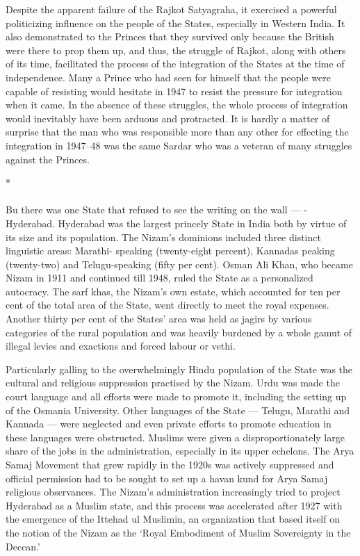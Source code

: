 \begin{multicols}{2}
Despite the apparent failure of the Rajkot Satyagraha, it exercised a powerful politicizing influence on the people of the States, especially in Western India. It also demonstrated to the Princes that they survived only because the British were there to prop them up, and thus, the struggle of Rajkot, along with others of its time, facilitated the process of the integration of the States at the time of independence. Many a Prince who had seen for himself that the people were capable of resisting would hesitate in 1947 to resist the pressure for integration when it came. In the absence of these struggles, the whole process of integration would inevitably have been arduous and protracted. It is hardly a matter of surprise that the man who was responsible more than any other for effecting the integration in 1947--48 was the same Sardar who was a veteran of many struggles against the Princes.

\begin{center}*\end{center}

\paragraph*{}
Bu there was one State that refused to see the writing on the wall --- - Hyderabad. Hyderabad was the largest princely State in India both by virtue of its size and its population. The Nizam's dominions included three distinct linguistic areas: Marathi- speaking (twenty-eight percent), Kannadas peaking (twenty-two) and Telugu-speaking (fifty per cent). Osman Ali Khan, who became Nizam in 1911 and continued till 1948, ruled the State as a personalized autocracy. The sarf khas, the Nizam's own estate, which accounted for ten per cent of the total area of the State, went directly to meet the royal expenses. Another thirty per cent of the States' area was held as jagirs by various categories of the rural population and was heavily burdened by a whole gamut of illegal levies and exactions and forced labour or vethi. 

Particularly galling to the overwhelmingly Hindu population of the State was the cultural and religious suppression practised by the Nizam. Urdu was made the court language and all efforts were made to promote it, including the setting up of the Osmania University. Other languages of the State --- Telugu, Marathi and Kannada --- were neglected and even private efforts to promote education in these languages were obstructed. Muslims were given a disproportionately large share of the jobs in the administration, especially in its upper echelons. The Arya Samaj Movement that grew rapidly in the 1920s was actively suppressed and official permission had to be sought to set up a havan kund for Arya Samaj religious observances. The Nizam's administration increasingly tried to project Hyderabad as a Muslim state, and this process was accelerated after 1927 with the emergence of the Ittehad ul Muslimin, an organization that based itself on the notion of the Nizam as the `Royal Embodiment of Muslim Sovereignty in the Deccan.' 


\end{multicols}

